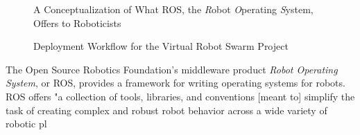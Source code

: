 \documentclass[9pt,twocolumn,twoside]{../../styles/osajnl}
\begin{document}
\begin{figure}[htbp]
\centering
{}
\caption{A Conceptualization of What ROS, the \textit{R}obot \textit{O}perating \textit{S}ystem, Offers to Roboticists \cite{www-ros-ros-is}}
\label{fig:rosOverview}
\end{figure}

\begin{figure}[htbp]
\centering
{}
\caption{Deployment Workflow for the Virtual Robot Swarm Project}
\label{fig:deployWorkflow}
\end{figure}

The Open Source Robotics Foundation's middleware product \textit{Robot Operating System}, or ROS, provides a framework for writing operating systems for robots.  ROS offers "a collection of tools, libraries, and conventions [meant to] simplify the task of creating complex and robust robot behavior across a wide variety of robotic pl
\end{document}
